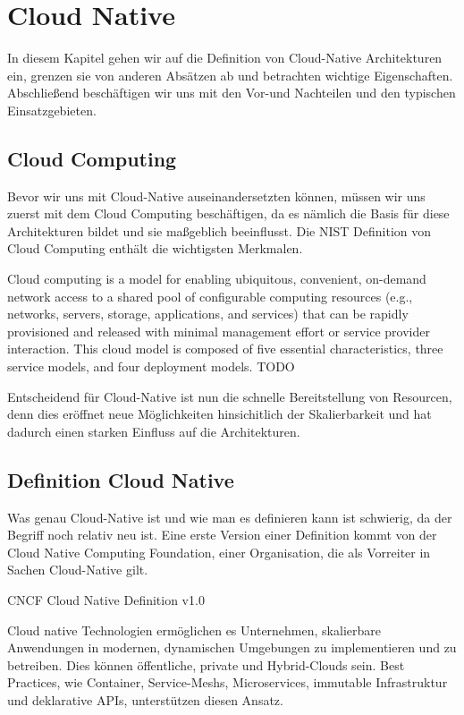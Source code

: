 \chapter{Cloud Native}

In diesem Kapitel gehen wir auf die Definition von Cloud-Native Architekturen ein, grenzen sie von anderen Absätzen ab und betrachten wichtige Eigenschaften. Abschließend beschäftigen wir uns mit den Vor-und Nachteilen und den typischen Einsatzgebieten.

\section{Cloud Computing}
Bevor wir uns mit Cloud-Native auseinandersetzten können, müssen wir uns zuerst mit dem Cloud Computing beschäftigen, da es nämlich die Basis für diese Architekturen bildet und sie maßgeblich beeinflusst. Die NIST Definition von Cloud Computing enthält die wichtigsten Merkmalen.

Cloud computing is a model for enabling ubiquitous, convenient, on-demand network access to a shared pool of configurable computing resources (e.g., networks, servers, storage, applications, and services) that can be rapidly provisioned and released with minimal management effort or service provider interaction. This cloud model is composed of five essential characteristics, three service models, and four deployment models. TODO

Entscheidend für Cloud-Native ist nun die schnelle Bereitstellung von Resourcen, denn dies eröffnet neue Möglichkeiten hinsichitlich der Skalierbarkeit und hat dadurch einen starken Einfluss auf die Architekturen.

\section{Definition Cloud Native}
Was genau Cloud-Native ist und wie man es definieren kann ist schwierig, da der Begriff noch relativ neu ist. Eine erste Version einer Definition kommt von der Cloud Native Computing Foundation, einer Organisation, die als Vorreiter in Sachen Cloud-Native gilt.

CNCF Cloud Native Definition v1.0

Cloud native Technologien ermöglichen es Unternehmen, skalierbare Anwendungen in modernen, dynamischen Umgebungen zu implementieren und zu betreiben. Dies können öffentliche, private und Hybrid-Clouds sein. Best Practices, wie Container, Service-Meshs, Microservices, immutable Infrastruktur und deklarative APIs, unterstützen diesen Ansatz.

